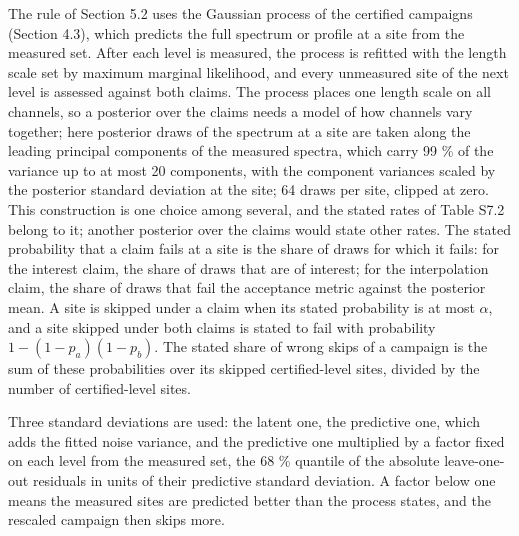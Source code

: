 \documentclass{iopjournal}
\begin{document}
The rule of Section 5.2 uses the Gaussian process of the certified campaigns (Section 4.3), which predicts the full spectrum or profile at a site from the measured set. After each level is measured, the process is refitted with the length scale set by maximum marginal likelihood, and every unmeasured site of the next level is assessed against both claims. The process places one length scale on all channels, so a posterior over the claims needs a model of how channels vary together; here posterior draws of the spectrum at a site are taken along the leading principal components of the measured spectra, which carry 99 \% of the variance up to at most 20 components, with the component variances scaled by the posterior standard deviation at the site; 64 draws per site, clipped at zero. This construction is one choice among several, and the stated rates of Table S7.2 belong to it; another posterior over the claims would state other rates. The stated probability that a claim fails at a site is the share of draws for which it fails: for the interest claim, the share of draws that are of interest; for the interpolation claim, the share of draws that fail the acceptance metric against the posterior mean. A site is skipped under a claim when its stated probability is at most \ensuremath{\alpha}, and a site skipped under both claims is stated to fail with probability \(1 - (1 - p_a)(1 - p_b)\). The stated share of wrong skips of a campaign is the sum of these probabilities over its skipped certified-level sites, divided by the number of certified-level sites.

Three standard deviations are used: the latent one, the predictive one, which adds the fitted noise variance, and the predictive one multiplied by a factor fixed on each level from the measured set, the 68 \% quantile of the absolute leave-one-out residuals in units of their predictive standard deviation. A factor below one means the measured sites are predicted better than the process states, and the rescaled campaign then skips more.
\end{document}
